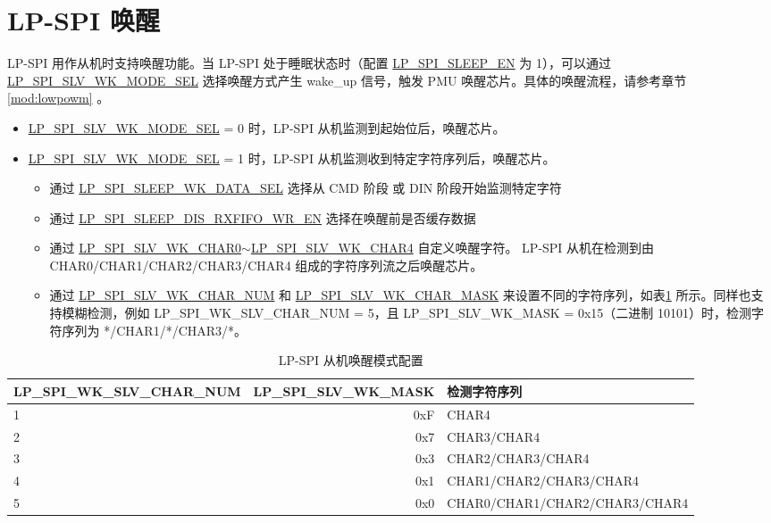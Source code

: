 \documentclass[main\_\_CN.tex]{subfiles}
\begin{document}
\section{LP-SPI 唤醒}
LP-SPI 用作从机时支持唤醒功能。当 LP-SPI 处于睡眠状态时（配置 \hyperref[fielddesc:LPSPISLEEPEN]{LP\_SPI\_SLEEP\_EN} 为 1），可以通过 \hyperref[fielddesc:LPSPISLVWKMODESEL]{LP\_SPI\_SLV\_WK\_MODE\_SEL} 选择唤醒方式产生 wake\_up 信号，触发 PMU 唤醒芯片。具体的唤醒流程，请参考章节 \ref{mod:lowpowm} \textit{}。
\begin{itemize}
    \item \hyperref[fielddesc:LPSPISLVWKMODESEL]{LP\_SPI\_SLV\_WK\_MODE\_SEL} = 0 时，LP-SPI 从机监测到起始位后，唤醒芯片。
    \item \hyperref[fielddesc:LPSPISLVWKMODESEL]{LP\_SPI\_SLV\_WK\_MODE\_SEL} = 1 时，LP-SPI 从机监测收到特定字符序列后，唤醒芯片。
    \begin{itemize}
        \item 通过 \hyperref[fielddesc:LPSPISLEEPWKDATASEL]{LP\_SPI\_SLEEP\_WK\_DATA\_SEL} 选择从 CMD 阶段 或 DIN 阶段开始监测特定字符
        \item 通过 \hyperref[fielddesc:LPSPISLEEPDISRXFIFOWREN]{LP\_SPI\_SLEEP\_DIS\_RXFIFO\_WR\_EN} 选择在唤醒前是否缓存数据
        \item 通过 \hyperref[fielddesc:LPSPISLVWKCHAR0]{LP\_SPI\_SLV\_WK\_CHAR0}$\sim$\hyperref[fielddesc:LPSPISLVWKCHAR1]{LP\_SPI\_SLV\_WK\_CHAR4} 自定义唤醒字符。 LP-SPI 从机在检测到由 CHAR0/CHAR1/CHAR2/CHAR3/CHAR4 组成的字符序列流之后唤醒芯片。
        \item 通过 \hyperref[fielddesc:LPSPISLVWKCHARNUM]{LP\_SPI\_SLV\_WK\_CHAR\_NUM} 和 \hyperref[fielddesc:LPSPISLVWKCHARMASK]{LP\_SPI\_SLV\_WK\_CHAR\_MASK} 来设置不同的字符序列，如表\ref{table:lpspi_sleep_wk} 所示。同样也支持模糊检测，例如 LP\_SPI\_WK\_SLV\_CHAR\_NUM = 5，且 LP\_SPI\_SLV\_WK\_MASK = 0x15（二进制 10101）时，检测字符序列为 */CHAR1/*/CHAR3/*。
    \end{itemize}
\end{itemize}
\begin{table}[H]
    \centering
    \caption{LP-SPI 从机唤醒模式配置}
    \label{table:lpspi_sleep_wk}
    \begin{tabular}[c]{|p{5.0cm}|r|l|}
    \rowcolor{lightgray}
    \textbf{LP\_SPI\_WK\_SLV\_CHAR\_NUM} & \textbf{LP\_SPI\_SLV\_WK\_MASK} & \textbf{检测字符序列} \\
    \hline
     1 &  0xF & CHAR4\\
     \hline
     2 &  0x7 & CHAR3/CHAR4 \\
    \hline
     3 &  0x3 & CHAR2/CHAR3/CHAR4 \\
    \hline
     4 &  0x1 & CHAR1/CHAR2/CHAR3/CHAR4 \\
    \hline
     5 &  0x0 & CHAR0/CHAR1/CHAR2/CHAR3/CHAR4 \\
    \hline    
    \end{tabular}
\end{table}
\end{document}
